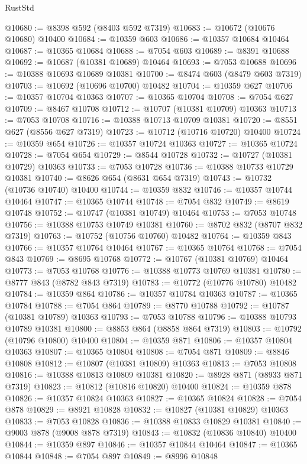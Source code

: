 \begin{lexlean}{RustStd}
\begin{coremodule}
@10680 := @8398 @592 (@8403 @592 @7319)
@10683 := @10672 (@10676 @10680) @10400
@10684 := @10359 @603
@10686 := @10357 @10684 @10464
@10687 := @10365 @10684
@10688 := @7054 @603
@10689 := @8391 @10688
@10692 := @10687 (@10381 @10689) @10464
@10693 := @7053 @10688
@10696 := @10388 @10693 @10689 @10381
@10700 := @8474 @603 (@8479 @603 @7319)
@10703 := @10692 (@10696 @10700) @10482
@10704 := @10359 @627
@10706 := @10357 @10704 @10363
@10707 := @10365 @10704
@10708 := @7054 @627
@10709 := @8467 @10708
@10712 := @10707 (@10381 @10709) @10363
@10713 := @7053 @10708
@10716 := @10388 @10713 @10709 @10381
@10720 := @8551 @627 (@8556 @627 @7319)
@10723 := @10712 (@10716 @10720) @10400
@10724 := @10359 @654
@10726 := @10357 @10724 @10363
@10727 := @10365 @10724
@10728 := @7054 @654
@10729 := @8544 @10728
@10732 := @10727 (@10381 @10729) @10363
@10733 := @7053 @10728
@10736 := @10388 @10733 @10729 @10381
@10740 := @8626 @654 (@8631 @654 @7319)
@10743 := @10732 (@10736 @10740) @10400
@10744 := @10359 @832
@10746 := @10357 @10744 @10464
@10747 := @10365 @10744
@10748 := @7054 @832
@10749 := @8619 @10748
@10752 := @10747 (@10381 @10749) @10464
@10753 := @7053 @10748
@10756 := @10388 @10753 @10749 @10381
@10760 := @8702 @832 (@8707 @832 @7319)
@10763 := @10752 (@10756 @10760) @10482
@10764 := @10359 @843
@10766 := @10357 @10764 @10464
@10767 := @10365 @10764
@10768 := @7054 @843
@10769 := @8695 @10768
@10772 := @10767 (@10381 @10769) @10464
@10773 := @7053 @10768
@10776 := @10388 @10773 @10769 @10381
@10780 := @8777 @843 (@8782 @843 @7319)
@10783 := @10772 (@10776 @10780) @10482
@10784 := @10359 @864
@10786 := @10357 @10784 @10363
@10787 := @10365 @10784
@10788 := @7054 @864
@10789 := @8770 @10788
@10792 := @10787 (@10381 @10789) @10363
@10793 := @7053 @10788
@10796 := @10388 @10793 @10789 @10381
@10800 := @8853 @864 (@8858 @864 @7319)
@10803 := @10792 (@10796 @10800) @10400
@10804 := @10359 @871
@10806 := @10357 @10804 @10363
@10807 := @10365 @10804
@10808 := @7054 @871
@10809 := @8846 @10808
@10812 := @10807 (@10381 @10809) @10363
@10813 := @7053 @10808
@10816 := @10388 @10813 @10809 @10381
@10820 := @8928 @871 (@8933 @871 @7319)
@10823 := @10812 (@10816 @10820) @10400
@10824 := @10359 @878
@10826 := @10357 @10824 @10363
@10827 := @10365 @10824
@10828 := @7054 @878
@10829 := @8921 @10828
@10832 := @10827 (@10381 @10829) @10363
@10833 := @7053 @10828
@10836 := @10388 @10833 @10829 @10381
@10840 := @9003 @878 (@9008 @878 @7319)
@10843 := @10832 (@10836 @10840) @10400
@10844 := @10359 @897
@10846 := @10357 @10844 @10464
@10847 := @10365 @10844
@10848 := @7054 @897
@10849 := @8996 @10848

\end{coremodule}
\end{lexlean}
